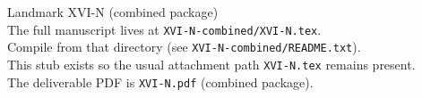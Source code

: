 \documentclass{article}
\begin{document}
\begin{center}
{\Large Landmark XVI-N (combined package)}\\[1em]
The full manuscript lives at \texttt{XVI-N-combined/XVI-N.tex}.\\
Compile from that directory (see \texttt{XVI-N-combined/README.txt}).\\[1em]
This stub exists so the usual attachment path \texttt{XVI-N.tex} remains present.\\
The deliverable PDF is \texttt{XVI-N.pdf} (combined package).
\end{center}
\end{document}
